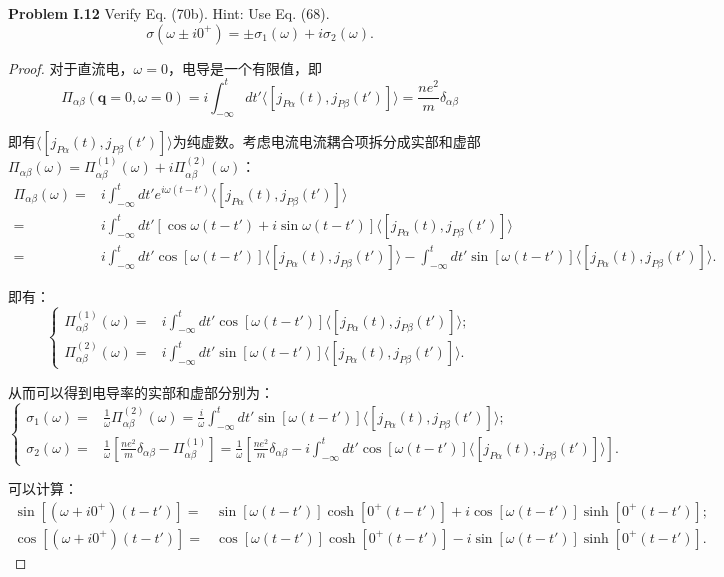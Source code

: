 \documentclass[reqno,a4paper,12pt]{amsart}
\begin{document}
\textbf{Problem I.12} Verify Eq. (70b). Hint: Use Eq. (68).
\[
	\sigma(\omega\pm i0^+) = \pm\sigma_1(\omega) + i\sigma_2(\omega). \tag{70b}
\]

\begin{proof}
对于直流电，$\omega = 0$，电导是一个有限值，即
\[
	\Pi_{\alpha\beta}(\mathbf{q}=0, \omega=0) = i\int_{-\infty}^t dt' \langle [j_{P\alpha}(t), j_{P\beta}(t')] \rangle = \frac{ne^2}{m}\delta_{\alpha\beta}
\]

即有$\langle [j_{P\alpha}(t), j_{P\beta}(t')] \rangle$为纯虚数。考虑电流电流耦合项拆分成实部和虚部$\Pi_{\alpha\beta}(\omega) = \Pi_{\alpha\beta}^{(1)}(\omega) + i\Pi_{\alpha\beta}^{(2)}(\omega)$：
\begin{align*}
	\Pi_{\alpha\beta}(\omega) =& i \int_{-\infty}^t dt' e^{i\omega(t-t')} \langle [j_{P\alpha}(t), j_{P\beta}(t')] \rangle \\
	=& i \int_{-\infty}^t dt' [\cos\omega(t-t') + i\sin\omega(t-t')] \langle [j_{P\alpha}(t), j_{P\beta}(t')] \rangle \\
	=& i\int_{-\infty}^t dt' \cos[\omega(t-t')] \langle [j_{P\alpha}(t), j_{P\beta}(t')] \rangle - \int_{-\infty}^t dt' \sin[\omega(t-t')] \langle [j_{P\alpha}(t), j_{P\beta}(t')] \rangle.
\end{align*}

即有：
\[
\left\{\begin{aligned}
	\Pi_{\alpha\beta}^{(1)}(\omega) =& i\int_{-\infty}^t dt' \cos[\omega(t-t')] \langle [j_{P\alpha}(t), j_{P\beta}(t')] \rangle; \\
	\Pi_{\alpha\beta}^{(2)}(\omega) =& i\int_{-\infty}^t dt' \sin[\omega(t-t')] \langle [j_{P\alpha}(t), j_{P\beta}(t')] \rangle.
\end{aligned} \right.
\]



从而可以得到电导率的实部和虚部分别为：
\[
\left\{ \begin{aligned}
	\sigma_1(\omega) =& \frac{1}{\omega}\Pi^{(2)}_{\alpha\beta}(\omega) = \frac{i}{\omega} \int_{-\infty}^t dt' \sin[\omega(t-t')] \langle [j_{P\alpha}(t), j_{P\beta}(t')] \rangle; \\
	\sigma_2(\omega) =& \frac{1}{\omega} \left[ \frac{ne^2}{m}\delta_{\alpha\beta} - \Pi^{(1)}_{\alpha\beta} \right] = \frac{1}{\omega} \left[ \frac{ne^2}{m}\delta_{\alpha\beta} - i\int_{-\infty}^t dt' \cos[\omega(t-t')] \langle [j_{P\alpha}(t), j_{P\beta}(t')] \rangle \right].
\end{aligned} \right. 
\]

可以计算：
\[
\begin{aligned}
	\sin[(\omega+i0^+)(t-t')] =& \sin[\omega(t-t')]\cosh[0^+(t-t')] + i\cos[\omega(t-t')]\sinh[0^+(t-t')]; \\
	\cos[(\omega+i0^+)(t-t')] =& \cos[\omega(t-t')]\cosh[0^+(t-t')] - i\sin[\omega(t-t')]\sinh[0^+(t-t')].
\end{aligned}
\]


\end{proof}
\end{document}
